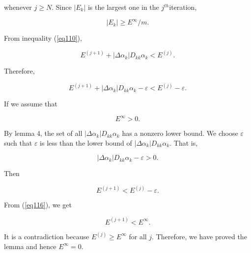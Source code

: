 \documentclass [18pt]{article}
\begin{document}
\noindent
whenever $j \ge N$. Since $\left| {E_k } \right|$ is the largest one in the
$j^{th}$iteration,


\begin{equation}
\label{eq117}
\left| {E_k } \right| \ge E^\infty / m.
\end{equation}



From inequality (\ref{eq110}),


\begin{equation}
\label{eq118}
E^{(j + 1)} + \left| {\Delta \alpha _k } \right|D_{kk} \alpha _k < E^{(j)}.
\end{equation}



Therefore,


\begin{equation}
\label{eq119}
E^{(j + 1)} + \left| {\Delta \alpha _k } \right|D_{kk} \alpha _k -
\varepsilon < E^{(j)} - \varepsilon .
\end{equation}



If we assume that


\begin{equation}
\label{eq120}
E^\infty > 0.
\end{equation}



By lemma 4, the set of all $\left| {\Delta \alpha _k } \right|D_{kk} \alpha
_k $ has a nonzero lower bound. We choose $\varepsilon $ such that
$\varepsilon $ is less than the lower bound of $\left| {\Delta \alpha _k }
\right|D_{kk} \alpha _k $. That is,


\begin{equation}
\label{eq121}
\left| {\Delta \alpha _k } \right|D_{kk} \alpha _k - \varepsilon > 0.
\end{equation}



Then


\begin{equation}
\label{eq122}
E^{(j + 1)} < E^{(j)} - \varepsilon .
\end{equation}



From (\ref{eq116}), we get


\begin{equation}
\label{eq123}
E^{(j + 1)} < E^\infty .
\end{equation}



It is a contradiction because $E^{(j)} \ge E^\infty $ for all $j$.
Therefore, we have proved the lemma and hence $E^\infty = 0$.
\end{document}

